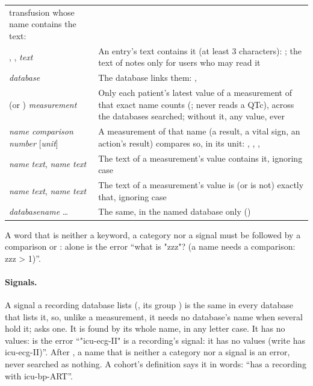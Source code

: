 \begin{xltabular}{\linewidth}{@{}P{5.6cm}L@{}}
  transfusion whose name contains the text:  \\
, ,  \emph{text} & An entry's text contains it (at least
  3 characters): ; the text of notes only for users who may read
  it \\
 \emph{database} & The database links them: ,
   \\
 (or ) \emph{measurement} & Only each patient's latest value of a
  measurement of that exact name counts (;  never reads
  a QTc), across the databases searched; without it, any value, ever \\
\emph{name comparison number} [\emph{unit}] & A measurement of that name (a result, a vital
  sign, an action's result) compares so, in its unit: ,
  , ,  \\
\emph{name}  \emph{text}, \emph{name} \code{\textasciitilde} \emph{text} & The
  text of a measurement's value contains it, ignoring case \\
\emph{name} \code{=} \emph{text}, \emph{name} \code{!=} \emph{text} & The text of a
  measurement's value is (or is not) exactly that, ignoring case \\
\emph{database}\emph{name} \dots & The same, in the named database only
  () \\
\end{xltabular}

A word that is neither a keyword, a category nor a signal must be followed by a comparison or
:  alone is the error ``what is "zzz"? (a name needs a comparison:
zzz > 1)''.

\paragraph{Signals.} A signal a recording database lists (, its group
) is the same in every database that lists it, so, unlike a measurement, it needs
no database's name when several hold it;  asks one. It is found by its
whole name, in any letter case. It has no values:  is the error
``"icu-ecg-II" is a recording's signal: it has no values (write has icu-ecg-II)''. After
, a name that is neither a category nor a signal is an error, never searched as
nothing. A cohort's definition says it in words: ``has a recording with icu-bp-ART''.

